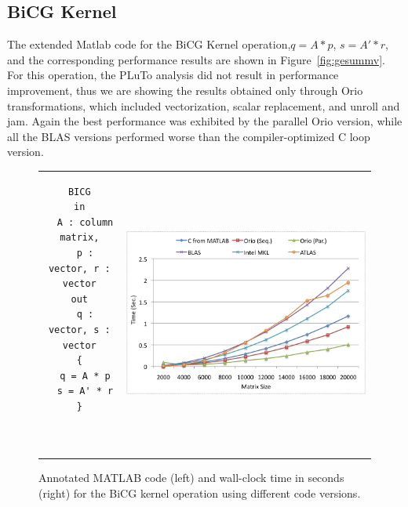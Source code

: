 \documentclass[runningheads]{llncs}
\begin{document}
\subsection{BiCG Kernel}

The extended Matlab code for the BiCG Kernel operation,$q = A * p$, $s = A' * r$,
and the corresponding performance results are shown in Figure~\ref{fig:gesummv}. For this operation, the PLuTo analysis did not result in performance improvement, thus we are showing the results obtained only through Orio transformations, which included vectorization, scalar replacement, and unroll and jam. Again the best performance was exhibited by the parallel Orio version, while all the BLAS versions performed worse than the compiler-optimized C loop version.


\begin{figure}[htp]
\centering
\begin{tabular}{cc}
\begin{minipage}[b]{.3\textwidth}
\footnotesize
\begin{verbatim}
BICG
in
  A : column matrix,
  p : vector, r : vector
out
  q : vector, s : vector
{
  q = A * p
  s = A' * r
}



\end{verbatim}
\end{minipage}
&
\begin{minipage}[b]{.6\textwidth}
\includegraphics[width=\textwidth]{figures/bicgkernel.png}
\end{minipage}\\
\end{tabular}
\caption{Annotated MATLAB code (left) and wall-clock time in seconds (right) for the BiCG kernel operation using different code versions.}
\label{fig:bicgkernel}
\end{figure}
\end{document}
